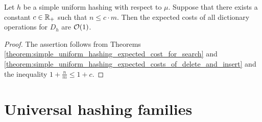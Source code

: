 \begin{corollary}\label{corollary:constant_expected_costs_of_dictionary_operations_for_simple_uniform_hashing}
Let $h$ be a simple uniform hashing with respect to $\mu$. Suppose that there exists a constant $c\in {\mathbb R}_+$ such that $n\leq c\cdot m$. Then the expected costs of all dictionary operations for $D_h$ are ${\mathcal O}(1)$.
\end{corollary}
\begin{proof}
The assertion follows from Theorems \ref{theorem:simple_uniform_hashing_expected_cost_for_search} and \ref{theorem:simple_uniform_hashing_expected_costs_of_delete_and_insert} and the inequality $1 + \frac{n}{m} \leq 1 + c$.
\end{proof}

\section{Universal hashing families}


